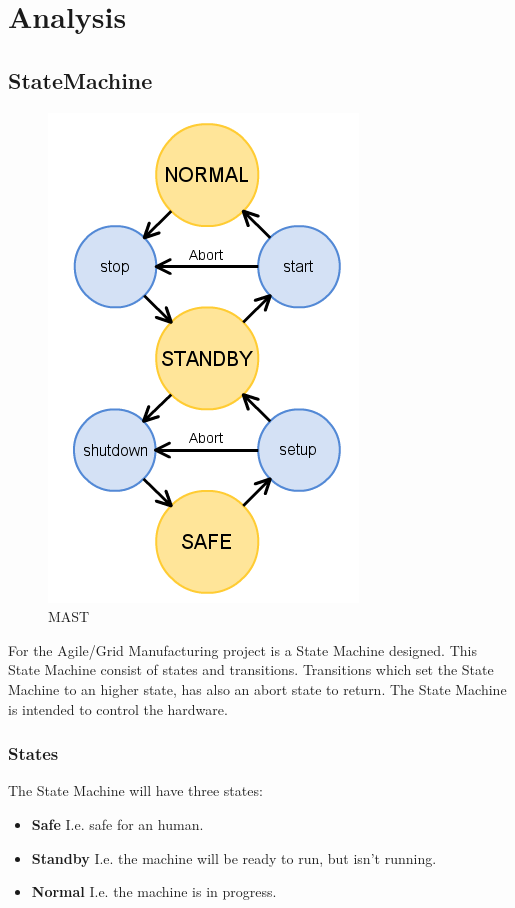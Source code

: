 \chapter{Analysis}
\section{StateMachine}
\begin{figure}
	\begin{center}
		\includegraphics[scale=0.5]{pictures/mast.png}
	\caption{MAST}
	\vspace{-100pt}
	\end{center}
\end{figure}
For the Agile/Grid Manufacturing project is a State Machine designed. This State Machine consist of states and transitions. Transitions which set the State Machine to an higher state, has also an abort state to return. The State Machine is intended to control the hardware.
\subsection{States}
The State Machine will have three states:
\begin{itemize}
\item \textbf{Safe} I.e. safe for an human.
\item \textbf{Standby} I.e. the machine will be ready to run, but isn’t running.
\item \textbf{Normal} I.e. the machine is in progress.
\end{itemize}
\newpage
